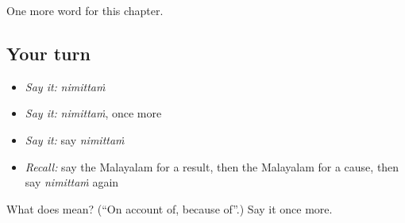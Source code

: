 \begin{grammarlens}[title={What you've built}]
One more word for this chapter.
\end{grammarlens}

\subsection*{Your turn}
\begin{itemize}
\raggedright
  \item \emph{Say it:} \emph{nimittaṁ}
  \item \emph{Say it:} \emph{nimittaṁ}, once more
  \item \emph{Say it:} say \emph{nimittaṁ}
  \item \emph{Recall:} say the Malayalam for a result, then the Malayalam for a cause, then say \emph{nimittaṁ} again
\end{itemize}

\begin{tcolorbox}[breakable,colback=teal!4,colframe=teal!35!black,title={Before you move on}]
What does  mean? (\textquotedblleft{}On account of, because of\textquotedblright{}.) Say it once more.
\end{tcolorbox}
